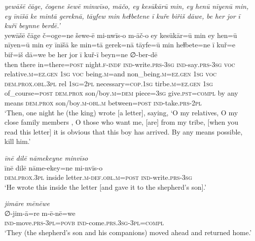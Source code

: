\ea \label{KŠ.56}
\textit{yewāšē čāge, čogene šewē minwīso, māčo, ey kesūkārū min, ey henū nīyenū min, ey īnīšā ke mintā gereknā, tāyfew min heɫbetene ī kuře biřiš dāwe, be her jor ī kuřī beynne berdē.’} \\ 
\gll yewāšē čāge č=oge=ne šewe-ē mi-nwīs-o m-āč-o ey kesūkār=ū min ey hen=ū nīyen=ū min ey īnīšā ke min=tā gerek=nā tāyfe=ū min heɫbete=ne ī kuř=e biř=iš dā=we be her jor ī kuř-ī beyn=ne ∅-ber-dē \\ 
 then there in=there\textsc{=\textsc{post}} night\textsc{.f}\textsc{-indf} \textsc{ind-}write\textsc{.prs}\textsc{-3sg} \textsc{ind-}say\textsc{.prs}\textsc{-3sg} \textsc{voc} relative\textsc{.m}\textsc{\textsc{=ez.gen}} \textsc{1sg} \textsc{voc} being\textsc{.m}=and non\_being\textsc{.m}\textsc{\textsc{=ez.gen}} \textsc{1sg} \textsc{voc} \textsc{dem.prox}\textsc{.obl}\textsc{.3pl} rel \textsc{1sg}=\textsc{2pl} necessary\textsc{=cop}\textsc{.\textsc{1sg}} tirbe\textsc{.m}\textsc{\textsc{=ez.gen}} \textsc{1sg} of\_course\textsc{=\textsc{post}} \textsc{dem.prox} son/boy\textsc{.m}\textsc{=dem} piece\textsc{=3sg} give\textsc{.pst}\textsc{=compl} by any means \textsc{dem.prox} son/boy\textsc{.m}\textsc{-obl}\textsc{.m} between\textsc{=\textsc{post}} \textsc{ind-}take\textsc{.prs}-\textsc{2pl} \\ 
\glt `Then, one night he (the king) wrote [a letter], saying, ‘O my relatives, O my close family members , O those who want me, [are] from my tribe, [when you read this letter] it is obvious that this boy has arrived. By any means possible, kill him.'
\z 
 
\ea \label{KŠ.57}
\textit{īnē dilē nāmekeyne minvīso} \\ 
\gll īnē dilē nāme-ekey=ne mi-nvīs-o \\ 
 \textsc{dem.prox}\textsc{.3pl} inside letter\textsc{.m}\textsc{-def}\textsc{.obl}\textsc{.m}\textsc{=\textsc{post}} \textsc{ind-}write\textsc{.prs}\textsc{-3sg} \\ 
\glt `He wrote this inside the letter [and gave it to the shepherd’s son].'
\z 
 
\ea \label{KŠ.58}
\textit{jimāre mēnēwe} \\ 
\gll ∅-jim-ā=re m-ē-nē=we \\ 
 \textsc{ind-}move\textsc{.prs}\textsc{-3pl}\textsc{=\textsc{povb}} \textsc{ind-}come\textsc{.prs}\textsc{.3sg}\textsc{-3pl}\textsc{=compl} \\ 
\glt `They (the shepherd’s son and his companions) moved ahead and returned home.'
\z 
 
